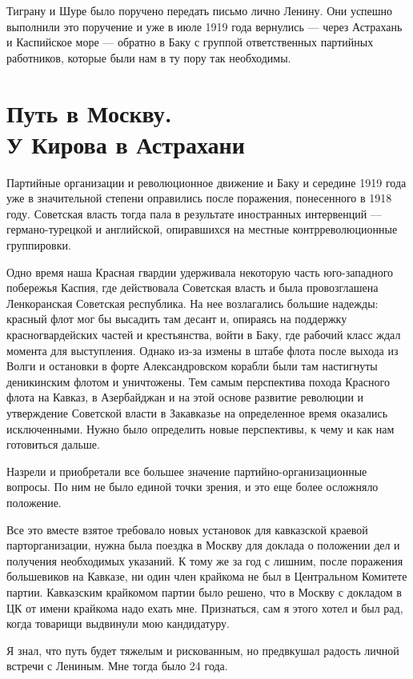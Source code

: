 \documentclass[12pt, a4paper, openany]{book}
\begin{document}
Тиграну и Шуре было поручено передать письмо лично Ленину. Они успешно выполнили это поручение и уже в июле 1919 года вернулись — через Астрахань и Каспийское море — обратно в Баку с группой ответственных партийных работников, которые были нам в ту пору так необходимы.

\newpage
\section[Путь в Москву. У Кирова в Астрахани]{\center \textbf{Путь в Москву. \\ У Кирова в Астрахани}}


Партийные организации и революционное движение и Баку и середине 1919 года уже в значительной степени оправились после поражения, понесенного в 1918 году. Советская власть тогда пала в результате иностранных интервенций — германо-турецкой и английской, опиравшихся на местные контрреволюционные группировки.

Одно время наша Красная гвардии удерживала некоторую часть юго-западного побережья Каспия, где действовала Советская власть и была провозглашена Ленкоранская Советская республика. На нее возлагались большие надежды: красный флот мог бы высадить там десант и, опираясь на поддержку красногвардейских частей и крестьянства, войти в Баку, где рабочий класс ждал момента для выступления. Однако из-за измены в штабе флота после выхода из Волги и остановки в форте Александровском корабли были там настигнуты деникинским флотом и уничтожены. Тем самым перспектива похода Красного флота на Кавказ, в Азербайджан и на этой основе развитие революции и утверждение Советской власти в Закавказье на определенное время оказались исключенными. Нужно было определить новые перспективы, к чему и как нам готовиться дальше.

Назрели и приобретали все большее значение партийно-организационные вопросы. По ним не было единой точки зрения, и это еще более осложняло положение.

Все это вместе взятое требовало новых установок для кавказской краевой парторганизации, нужна была поездка в Москву для доклада о положении дел и получения необходимых указаний. К тому же за год с лишним, после поражения большевиков на Кавказе, ни один член крайкома не был в Центральном Комитете партии. Кавказским крайкомом партии было решено, что в Москву с докладом в ЦК от имени крайкома надо ехать мне. Признаться, сам я этого хотел и был рад, когда товарищи выдвинули мою кандидатуру.

Я знал, что путь будет тяжелым и рискованным, но предвкушал радость личной встречи с Лениным. Мне тогда было 24 года.
\end{document}
